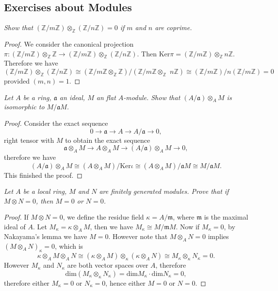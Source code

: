 \subsection{Exercises about Modules}
\begin{problem}\em
Show that $(\mathbb{Z}/m\mathbb{Z})\otimes_\mathbb{Z}(\mathbb{Z}/n\mathbb{Z})=0$ if $m$ and $n$ are coprime.
\end{problem}
\begin{proof}
We consider the canonical projection $\pi:(\mathbb{Z}/m\mathbb{Z})\otimes_\mathbb{Z}\mathbb{Z}\to(\mathbb{Z}/m\mathbb{Z})\otimes_\mathbb{Z}(\mathbb{Z}/n\mathbb{Z})$. Then $\mathrm{Ker}\pi=(\mathbb{Z}/m\mathbb{Z})\otimes_\mathbb{Z}n\mathbb{Z}$. Therefore we have 
$$
\left( \mathbb{Z} /m\mathbb{Z} \right) \otimes _{\mathbb{Z}}\left( \mathbb{Z} /n\mathbb{Z} \right) \cong \left( \mathbb{Z} /m\mathbb{Z} \otimes _{\mathbb{Z}}\mathbb{Z} \right) /\left( \mathbb{Z} /m\mathbb{Z} \otimes _{\mathbb{Z}}\,\,n\mathbb{Z} \right) \cong \left( \mathbb{Z} /m\mathbb{Z} \right) /n\left( \mathbb{Z} /m\mathbb{Z} \right) =0
$$
provided $(m,n)=1$.
\end{proof}
\begin{problem}\em
Let $A$ be a ring, $\mathfrak{a}$ an ideal, $M$ an flat $A$-module. Show that $(A/\mathfrak{a})\otimes_AM$ is isomorphic to $M/\mathfrak{a}M$.
\end{problem}
\begin{proof}
Consider the exact sequence 
$$
0\longrightarrow \mathfrak{a} \longrightarrow A\longrightarrow A/\mathfrak{a} \longrightarrow 0,
$$
right tensor with $M$ to obtain the exact sequence 
$$
\mathfrak{a} \otimes _AM\longrightarrow A\otimes _AM\longrightarrow \left( A/\mathfrak{a} \right) \otimes _AM\longrightarrow 0,
$$
therefore we have 
$$
\left( A/\mathfrak{a} \right) \otimes _AM\cong \left( A\otimes _AM \right) /\mathrm{Ker}\iota \cong \left( A\otimes _AM \right) /\mathfrak{a} M\cong M/\mathfrak{a} M.
$$
This finished the proof.
\end{proof}
\begin{problem}\em
Let $A$ be a local ring, $M$ and $N$ are finitely generated modules. Prove that if $M\otimes N=0$, then $M=0$ or $N=0$.
\end{problem}
\begin{proof}
If $M\otimes N=0$, we define the residue field $\kappa=A/\mathfrak{m}$, where $\mathfrak{m}$ is the maximal ideal of $A$. Let $M_\kappa=\kappa\otimes_AM$, then we have $M_\kappa\cong M/\mathfrak{m}M$. Now if $M_\kappa=0$, by Nakayama's lemma we have $M=0$. However note that $M\otimes_AN=0$ implies $(M\otimes_AN)_\kappa=0$, which is 
$$
\kappa \otimes _AM\otimes _AN\cong \left( \kappa \otimes _AM \right) \otimes _{\kappa}\left( \kappa \otimes _AN \right) \cong M_{\kappa}\otimes _{\kappa}N_{\kappa}=0.
$$
However $M_\kappa$ and $N_\kappa$ are both vector spaces over $A$, therefore 
$$
\mathrm{dim}\left( M_{\kappa}\otimes _{\kappa}N_{\kappa} \right) =\mathrm{dim}M_{\kappa}\cdot \mathrm{dim}N_{\kappa}=0,
$$
therefore either $M_\kappa=0$ or $N_\kappa=0$, hence either $M=0$ or $N=0$.
\end{proof}

